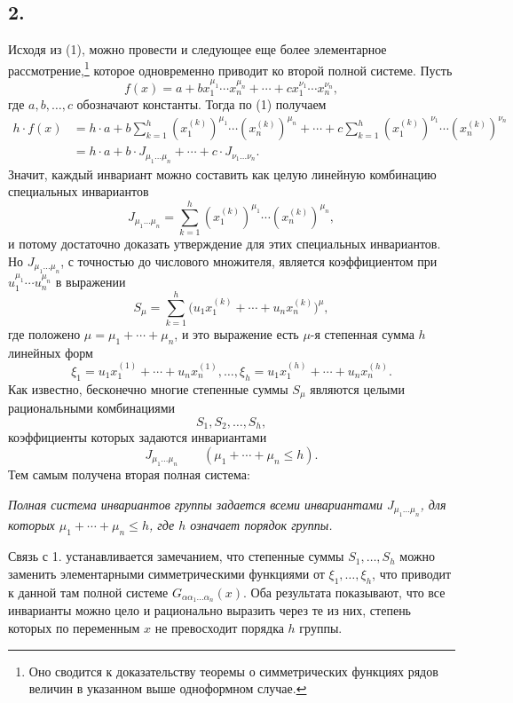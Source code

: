 \documentclass[11pt]{article}
\begin{document}
\subsection*{2.}
Исходя из (1), можно провести и следующее еще более элементарное рассмотрение,\footnote{Оно сводится к доказательству теоремы о симметрических функциях рядов величин в указанном выше одноформном случае.} которое одновременно приводит ко второй полной системе. Пусть
\[
  f(x)=a+b x_1^{\mu_1}\cdots x_n^{\mu_n}
       +\cdots+c x_1^{\nu_1}\cdots x_n^{\nu_n},
\]
где $a,b,\ldots,c$ обозначают константы. Тогда по (1) получаем
\[
\begin{aligned}
 h\cdot f(x)
 &=h\cdot a+b\sum_{k=1}^{h}(x_1^{(k)})^{\mu_1}\cdots(x_n^{(k)})^{\mu_n}
     +\cdots
     +c\sum_{k=1}^{h}(x_1^{(k)})^{\nu_1}\cdots(x_n^{(k)})^{\nu_n} \\
 &=h\cdot a+b\cdot J_{\mu_1\ldots\mu_n}+\cdots+c\cdot J_{\nu_1\ldots\nu_n}.
\end{aligned}
\]
Значит, каждый инвариант можно составить как целую линейную комбинацию специальных инвариантов
\[
  J_{\mu_1\ldots\mu_n}
  =\sum_{k=1}^{h}(x_1^{(k)})^{\mu_1}\cdots(x_n^{(k)})^{\mu_n},
\]
и потому достаточно доказать утверждение для этих специальных инвариантов. Но $J_{\mu_1\ldots\mu_n}$, с точностью до числового множителя, является коэффициентом при $u_1^{\mu_1}\cdots u_n^{\mu_n}$ в выражении
\[
  S_\mu=\sum_{k=1}^{h}
  \bigl(u_1x_1^{(k)}+\cdots+u_nx_n^{(k)}\bigr)^{\mu},
\]
где положено $\mu=\mu_1+\cdots+\mu_n$, и это выражение есть $\mu$-я степенная сумма $h$ линейных форм
\[
  \xi_1=u_1x_1^{(1)}+\cdots+u_nx_n^{(1)},\ldots,
  \xi_h=u_1x_1^{(h)}+\cdots+u_nx_n^{(h)}.
\]
Как известно, бесконечно многие степенные суммы $S_\mu$ являются целыми рациональными комбинациями
\[
  S_1,S_2,\ldots,S_h,
\]
коэффициенты которых задаются инвариантами
\[
  J_{\mu_1\ldots\mu_n}\qquad(\mu_1+\cdots+\mu_n\le h).
\]
Тем самым получена вторая полная система:

\emph{Полная система инвариантов группы задается всеми инвариантами $J_{\mu_1\ldots\mu_n}$, для которых $\mu_1+\cdots+\mu_n\le h$, где $h$ означает порядок группы.}

Связь с 1. устанавливается замечанием, что степенные суммы $S_1,\ldots,S_h$ можно заменить элементарными симметрическими функциями от $\xi_1,\ldots,\xi_h$, что приводит к данной там полной системе $G_{\alpha\alpha_1\ldots\alpha_n}(x)$. Оба результата показывают, что все инварианты можно цело и рационально выразить через те из них, степень которых по переменным $x$ не превосходит порядка $h$ группы.
\end{document}
